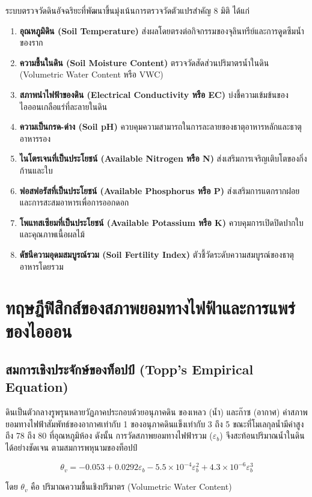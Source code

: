 ระบบตรวจวัดดินอัจฉริยะที่พัฒนาขึ้นมุ่งเน้นการตรวจวัดตัวแปรสำคัญ 8 มิติ ได้แก่
\begin{enumerate}
    \item \textbf{อุณหภูมิดิน (Soil Temperature)} ส่งผลโดยตรงต่อกิจกรรมของจุลินทรีย์และการดูดซึมน้ำของราก
    \item \textbf{ความชื้นในดิน (Soil Moisture Content)} ตรวจวัดสัดส่วนปริมาตรน้ำในดิน (Volumetric Water Content หรือ VWC)
    \item \textbf{สภาพนำไฟฟ้าของดิน (Electrical Conductivity หรือ EC)} บ่งชี้ความเข้มข้นของไอออนเกลือแร่ที่ละลายในดิน
    \item \textbf{ความเป็นกรด-ด่าง (Soil pH)} ควบคุมความสามารถในการละลายของธาตุอาหารหลักและธาตุอาหารรอง
    \item \textbf{ไนโตรเจนที่เป็นประโยชน์ (Available Nitrogen หรือ N)} ส่งเสริมการเจริญเติบโตของกิ่งก้านและใบ
    \item \textbf{ฟอสฟอรัสที่เป็นประโยชน์ (Available Phosphorus หรือ P)} ส่งเสริมการแตกรากฝอยและการสะสมอาหารเพื่อการออกดอก
    \item \textbf{โพแทสเซียมที่เป็นประโยชน์ (Available Potassium หรือ K)} ควบคุมการเปิดปิดปากใบและคุณภาพเนื้อผลไม้
    \item \textbf{ดัชนีความอุดมสมบูรณ์รวม (Soil Fertility Index)} ตัวชี้วัดระดับความสมบูรณ์ของธาตุอาหารโดยรวม
\end{enumerate}

\section{ทฤษฎีฟิสิกส์ของสภาพยอมทางไฟฟ้าและการแพร่ของไอออน}

\subsection{สมการเชิงประจักษ์ของท็อปป์ (Topp's Empirical Equation)}
ดินเป็นตัวกลางรูพรุนหลายวัฏภาคประกอบด้วยอนุภาคดิน ของเหลว (น้ำ) และก๊าซ (อากาศ) ค่าสภาพยอมทางไฟฟ้าสัมพัทธ์ของอากาศเท่ากับ 1 ของอนุภาคดินแข็งเท่ากับ 3 ถึง 5 ขณะที่โมเลกุลน้ำมีค่าสูงถึง 78 ถึง 80 ที่อุณหภูมิห้อง ดังนั้น การวัดสภาพยอมทางไฟฟ้ารวม ($\varepsilon_b$) จึงสะท้อนปริมาณน้ำในดินได้อย่างชัดเจน ตามสมการพหุนามของท็อปป์

\begin{equation}
\theta_v = -0.053 + 0.0292\varepsilon_b - 5.5 \times 10^{-4}\varepsilon_b^2 + 4.3 \times 10^{-6}\varepsilon_b^3
\end{equation}

โดย $\theta_v$ คือ ปริมาณความชื้นเชิงปริมาตร (Volumetric Water Content)

